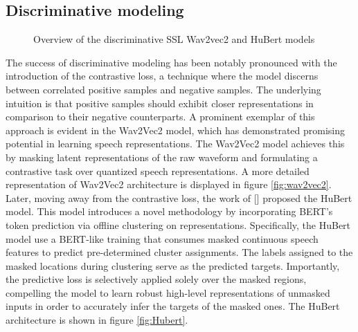 \subsection{Discriminative modeling}
\begin{figure}[ht]
    \centering
    \caption{Overview of the discriminative SSL Wav2vec2 and HuBert models}
\end{figure}
The success of discriminative modeling has been notably pronounced with the introduction of the contrastive loss, a technique where the model discerns between correlated positive samples and negative samples. The underlying intuition is that positive samples should exhibit closer representations in comparison to their negative counterparts. A prominent exemplar of this approach is evident in the Wav2Vec2 model, which has demonstrated promising potential in learning speech representations. The Wav2Vec2 model achieves this by masking latent representations of the raw waveform and formulating a contrastive task over quantized speech representations. A more detailed representation of Wav2Vec2 architecture is displayed in figure \ref{fig:wav2vec2}. Later, moving away from the contrastive loss, the work of [] proposed the HuBert model. This model introduces a novel methodology by incorporating BERT's token prediction via offline clustering on representations. Specifically, the HuBert model use a BERT-like training that consumes masked continuous speech features to predict pre-determined cluster assignments. The labels assigned to the masked locations during clustering serve as the predicted targets. Importantly, the predictive loss is selectively applied solely over the masked regions, compelling the model to learn robust high-level representations of unmasked inputs in order to accurately infer the targets of the masked ones. The HuBert architecture is shown in figure \ref{fig:Hubert}.
